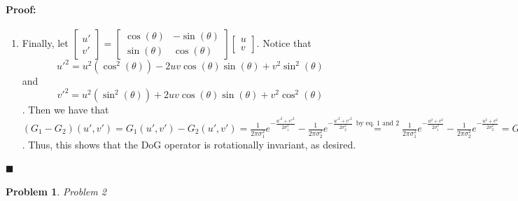 \documentclass[12pt]{article}
\newenvironment{proof}{\paragraph{Proof: }}{\hfill$\blacksquare$}
\newtheorem{problem}{Problem}%
\begin{document}
\begin{proof}
\begin{enumerate}
\item Finally, let $\left[\begin{matrix} u' \\ v' \end{matrix} \right] = \left[\begin{matrix} \cos(\theta) & -\sin(\theta) \\ \sin(\theta) & \cos(\theta) \end{matrix} \right] \left[\begin{matrix} u \\ v \end{matrix} \right]$. Notice that \begin{equation} u'^2 = u^2(\cos^2(\theta)) - 2uv\cos(\theta)\sin(\theta) + v^2 \sin^2(\theta) \end{equation} and \begin{equation} v'^2 = u^2(\sin^2(\theta)) + 2uv\cos(\theta)\sin(\theta) + v^2 \cos^2(\theta) \end{equation}. Then we have that $(G_1 - G_2)(u',v') = G_1(u',v') - G_2(u',v') = \frac{1}{2\pi \sigma_1^2} e^{-\frac{u'^2 + v'^2}{2\sigma_1^2}} - \frac{1}{2\pi \sigma_2^2} e^{-\frac{u'^2 + v'^2}{2\sigma_2^2}} \stackrel{\text{by eq. 1 and 2}}{=} \frac{1}{2\pi \sigma_1^2} e^{-\frac{u^2 + v^2}{2\sigma_1^2}} - \frac{1}{2\pi \sigma_2^2} e^{-\frac{u^2 + v^2}{2\sigma_2^2}} = G_1(u,v) - G_2(u,v)$. Thus, this shows that the DoG operator is rotationally invariant, as desired.

\end{enumerate}
\end{proof}

\begin{problem}
\normalfont
Problem 2
\end{problem}
\end{document}
